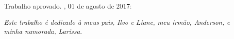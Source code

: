 \documentclass[
	12pt,				%
	openright,			%
	twoside,			%
	a4paper,			%
	final,
    french,             %
	spanish,			%
	english,			%
	brazil				%
	]{abntex2}
\begin{document}

%
% 
%
\begin{folhadeaprovacao}

	\begin{center}
		{\ABNTEXchapterfont\large\imprimirautor}

		\vspace*{\fill}\vspace*{\fill}
		\begin{center}
			\ABNTEXchapterfont\bfseries\Large\imprimirtitulo
		\end{center}
		\vspace*{\fill}

		\hspace{.45\textwidth}
		\begin{minipage}{.5\textwidth}
			\imprimirpreambulo
		\end{minipage}%
		\vspace*{\fill}
	\end{center}

	Trabalho aprovado. \imprimirlocal, 01 de agosto de 2017:


	\begin{center}
		\vspace*{0.5cm}
		{\large\imprimirlocal}
		\par
		{\large\imprimirdata}
		\vspace*{1cm}
	\end{center}

\end{folhadeaprovacao}

\begin{dedicatoria}
	\vspace*{\fill}
	\centering
	\noindent
	\textit{ Este trabalho é dedicado à meus pais, Ilvo e Liane, meu irmão, Anderson, e minha namorada, Larissa.} \vspace*{\fill}
\end{dedicatoria}
\end{document}
